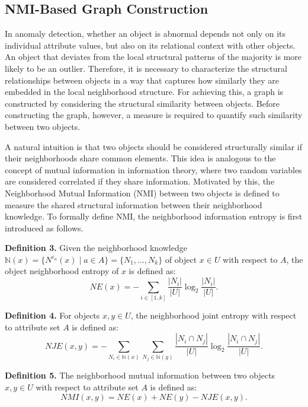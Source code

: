 \documentclass[lettersize,journal]{IEEEtran}
\begin{document}
\subsection{NMI-Based Graph Construction}

In anomaly detection, whether an object is abnormal depends not only on its individual attribute values,
but also on its relational context with other objects. An object that deviates from the local structural
patterns of the majority is more likely to be an outlier. Therefore, it is necessary to characterize the
structural relationships between objects in a way that captures how similarly they are embedded in the
local neighborhood structure. For achieving this, a graph is constructed by considering the structural
similarity between objects. Before constructing the graph, however, a measure is required to quantify
such similarity between two objects.

A natural intuition is that two objects should be considered structurally similar if their neighborhoods
share common elements. This idea is analogous to the concept of mutual information in information theory,
where two random variables are considered correlated if they share information. Motivated by this, the
Neighborhood Mutual Information (NMI) between two objects is defined to measure the shared structural
information between their neighborhood knowledge. To formally define NMI, the neighborhood information
entropy is first introduced as follows.

\textbf{Definition 3.} Given the neighborhood knowledge
\(\mathbb{N}(x) = \{N^{\varepsilon_{a}}(x) \mid a \in A\} = \{N_{1}, \ldots, N_{k}\}\) of object
\(x \in U\) with respect to \(A\), the object neighborhood entropy of \(x\) is defined as:
\begin{equation}
NE(x) = -\sum_{i \in [1, k]} \frac{|N_{i}|}{|U|} \log_{2} \frac{|N_{i}|}{|U|}.
\end{equation}

\textbf{Definition 4.} For objects \(x, y \in U\), the neighborhood joint entropy with respect to
attribute set \(A\) is defined as:
\begin{equation}
NJE(x, y) = -\sum_{N_{i} \in \mathbb{N}(x)} \sum_{N_{j} \in \mathbb{N}(y)}
            \frac{|N_{i} \cap N_{j}|}{|U|} \log_{2} \frac{|N_{i} \cap N_{j}|}{|U|}.
\end{equation}

\textbf{Definition 5.} The neighborhood mutual information between two objects \(x, y \in U\) with
respect to attribute set \(A\) is defined as:
\begin{equation}
NMI(x, y) = NE(x) + NE(y) - NJE(x, y).
\end{equation}
\end{document}

